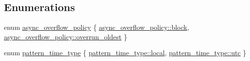 \subsection*{Enumerations}
\begin{DoxyCompactItemize}
\item 
enum \hyperlink{namespacespdlog_a42e109759a11c9514d3f6313a7709852}{async\+\_\+overflow\+\_\+policy} \{ \hyperlink{namespacespdlog_a42e109759a11c9514d3f6313a7709852a14511f2f5564650d129ca7cabc333278}{async\+\_\+overflow\+\_\+policy\+::block}, 
\hyperlink{namespacespdlog_a42e109759a11c9514d3f6313a7709852a6d09cc54ae10145444aa2f43fe46d9f2}{async\+\_\+overflow\+\_\+policy\+::overrun\+\_\+oldest}
 \}
\item 
enum \hyperlink{namespacespdlog_ad598fbd8338772e66ae09e8723a07ced}{pattern\+\_\+time\+\_\+type} \{ \hyperlink{namespacespdlog_ad598fbd8338772e66ae09e8723a07cedaf5ddaf0ca7929578b408c909429f68f2}{pattern\+\_\+time\+\_\+type\+::local}, 
\hyperlink{namespacespdlog_ad598fbd8338772e66ae09e8723a07ceda52d33cb937bbdab234ab1729a0f8225b}{pattern\+\_\+time\+\_\+type\+::utc}
 \}
\end{DoxyCompactItemize}
